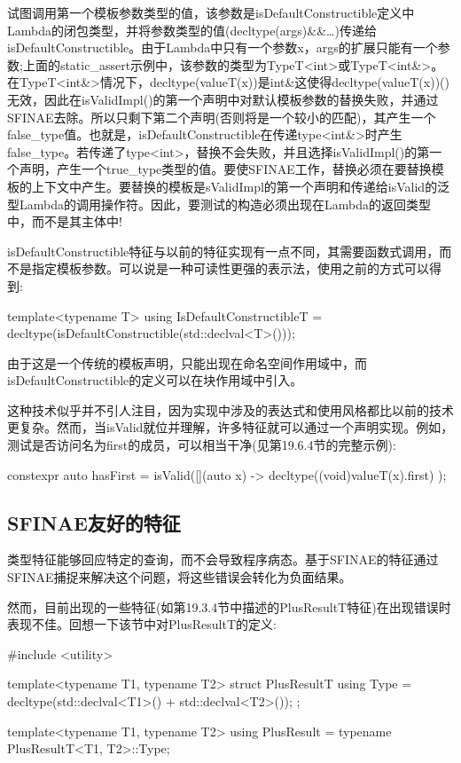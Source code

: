 试图调用第一个模板参数类型的值，该参数是isDefaultConstructible定义中Lambda的闭包类型，并将参数类型的值(decltype(args)\&\&…)传递给isDefaultConstructible。由于Lambda中只有一个参数x，args的扩展只能有一个参数;上面的static\_assert示例中，该参数的类型为TypeT<int>或TypeT<int\&>。在TypeT<int\&>情况下，decltype(valueT(x))是int\&这使得decltype(valueT(x))()无效，因此在isValidImpl()的第一个声明中对默认模板参数的替换失败，并通过SFINAE去除。所以只剩下第二个声明(否则将是一个较小的匹配)，其产生一个false\_type值。也就是，isDefaultConstructible在传递type<int\&>时产生false\_type。若传递了type<int>，替换不会失败，并且选择isValidImpl()的第一个声明，产生一个true\_type类型的值。要使SFINAE工作，替换必须在要替换模板的上下文中产生。要替换的模板是sValidImpl的第一个声明和传递给isValid的泛型Lambda的调用操作符。因此，要测试的构造必须出现在Lambda的返回类型中，而不是其主体中!

isDefaultConstructible特征与以前的特征实现有一点不同，其需要函数式调用，而不是指定模板参数。可以说是一种可读性更强的表示法，使用之前的方式可以得到:

\begin{cpp}
template<typename T>
using IsDefaultConstructibleT
	= decltype(isDefaultConstructible(std::declval<T>()));
\end{cpp}

由于这是一个传统的模板声明，只能出现在命名空间作用域中，而isDefaultConstructible的定义可以在块作用域中引入。

这种技术似乎并不引人注目，因为实现中涉及的表达式和使用风格都比以前的技术更复杂。然而，当isValid就位并理解，许多特征就可以通过一个声明实现。例如，测试是否访问名为first的成员，可以相当干净(见第19.6.4节的完整示例):

\begin{cpp}
constexpr auto hasFirst
	= isValid([](auto x) -> decltype((void)valueT(x).first) {
	});
\end{cpp}

\subsection{SFINAE友好的特征}

类型特征能够回应特定的查询，而不会导致程序病态。基于SFINAE的特征通过SFINAE捕捉来解决这个问题，将这些错误会转化为负面结果。

然而，目前出现的一些特征(如第19.3.4节中描述的PlusResultT特征)在出现错误时表现不佳。回想一下该节中对PlusResultT的定义:

\begin{cpp}
#include <utility>

template<typename T1, typename T2>
struct PlusResultT {
	using Type = decltype(std::declval<T1>() + std::declval<T2>());
};

template<typename T1, typename T2>
using PlusResult = typename PlusResultT<T1, T2>::Type;
\end{cpp}

